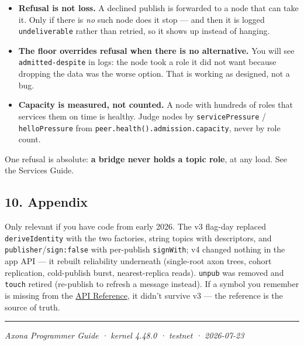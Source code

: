\documentclass[
  nobib]{tufte-handout}
\providecommand{\tightlist}{%
  \setlength{\itemsep}{0pt}\setlength{\parskip}{0pt}}
\renewcommand{\subsubsection}[1]{\medskip\par\noindent{\normalsize\bfseries #1}\par\nobreak\smallskip}
\begin{document}
\begin{itemize}
\tightlist
\item
  \textbf{Refusal is not loss.} A declined publish is forwarded to a
  node that can take it. Only if there is \emph{no} such node does it
  stop --- and then it is logged \texttt{undeliverable} rather than
  retried, so it shows up instead of hanging.
\item
  \textbf{The floor overrides refusal when there is no alternative.} You
  will see \texttt{admitted-despite} in logs: the node took a role it
  did not want because dropping the data was the worse option. That is
  working as designed, not a bug.
\item
  \textbf{Capacity is measured, not counted.} A node with hundreds of
  roles that services them on time is healthy. Judge nodes by
  \texttt{servicePressure} / \texttt{helloPressure} from
  \texttt{peer.health().admission.capacity}, never by role count.
\end{itemize}

One refusal is absolute: \textbf{a bridge never holds a topic role}, at
any load. See the Services Guide.

\subsection{10. Appendix}\label{appendix}

\subsubsection{Migrating from the v2/v3
lines}\label{migrating-from-the-v2v3-lines}

Only relevant if you have code from early 2026. The v3 flag-day replaced
\texttt{deriveIdentity} with the two factories, string topics with
descriptors, and \texttt{publisher}/\texttt{sign:false} with per-publish
\texttt{signWith}; v4 changed nothing in the app API --- it rebuilt
reliability underneath (single-root axon trees, cohort replication,
cold-publish burst, nearest-replica reads). \texttt{unpub} was removed
and \texttt{touch} retired (re-publish to refresh a message instead). If
a symbol you remember is missing from the
\href{Axona-API-Reference-v4.48.0.md}{API Reference}, it didn't survive
v3 --- the reference is the source of truth.

\begin{center}\rule{0.5\linewidth}{0.5pt}\end{center}

\emph{Axona Programmer Guide · kernel 4.48.0 · testnet · 2026-07-23}
\end{document}
